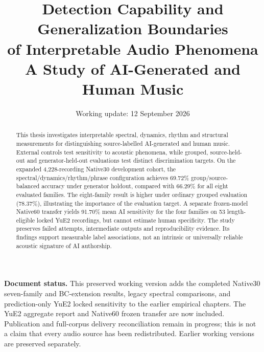 \documentclass[11pt,a4paper]{article}
\title{Detection Capability and Generalization Boundaries\\of Interpretable Audio Phenomena\\
\large A Study of AI-Generated and Human Music}
\author{}
\date{Working update: 12 September 2026}
\begin{document}
\maketitle
\noindent\textbf{Document status.} This preserved working version adds the completed
Native30 seven-family and BC-extension results, legacy spectral comparisons,
and prediction-only YuE2 locked sensitivity to the earlier empirical chapters.
The YuE2 aggregate report and Native60 frozen transfer are now included.
Publication and full-corpus delivery reconciliation remain in progress; this is
not a claim that every audio source has been redistributed. Earlier working
versions are preserved separately.
\begin{abstract}
This thesis investigates interpretable spectral, dynamics, rhythm and structural
measurements for distinguishing source-labelled AI-generated and human music.
External controls test sensitivity to acoustic phenomena, while grouped,
source-held-out and generator-held-out evaluations test distinct discrimination
targets. On the expanded 4,228-recording Native30 development cohort, the
spectral/dynamics/rhythm/phrase configuration achieves 69.72\% group/source-balanced
accuracy under generator holdout, compared with 66.29\% for all eight evaluated
families. The eight-family result is higher under ordinary grouped evaluation
(78.37\%), illustrating the importance of the evaluation target. A separate
frozen-model Native60 transfer yields 91.70\% mean AI sensitivity for the four
families on 53 length-eligible locked YuE2 recordings, but cannot estimate human
specificity. The study preserves failed attempts, intermediate outputs and
reproducibility evidence. Its findings support measurable label associations,
not an intrinsic or universally reliable acoustic signature of AI authorship.
\end{abstract}
\tableofcontents
\clearpage















\end{document}
